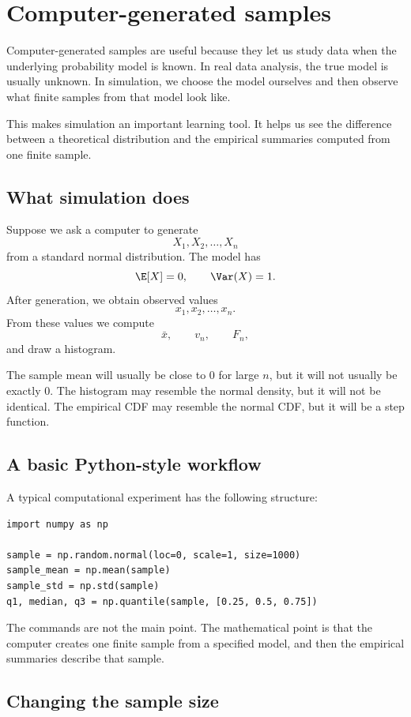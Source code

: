 \section{Computer-generated samples}

Computer-generated samples are useful because they let us study data when the
underlying probability model is known. In real data analysis, the true model is
usually unknown. In simulation, we choose the model ourselves and then observe
what finite samples from that model look like.

This makes simulation an important learning tool. It helps us see the difference
between a theoretical distribution and the empirical summaries computed from one
finite sample.

\subsection*{What simulation does}

Suppose we ask a computer to generate
\[
X_1,X_2,\ldots,X_n
\]
from a standard normal distribution. The model has
\[
\E[X]=0,
\qquad
\Var(X)=1.
\]
After generation, we obtain observed values
\[
x_1,x_2,\ldots,x_n.
\]
From these values we compute
\[
\bar{x},
\qquad
v_n,
\qquad
F_n,
\]
and draw a histogram.

The sample mean will usually be close to \(0\) for large \(n\), but it will not
usually be exactly \(0\). The histogram may resemble the normal density, but it
will not be identical. The empirical CDF may resemble the normal CDF, but it will
be a step function.

\subsection*{A basic Python-style workflow}

A typical computational experiment has the following structure:
\begin{verbatim}
import numpy as np

sample = np.random.normal(loc=0, scale=1, size=1000)
sample_mean = np.mean(sample)
sample_std = np.std(sample)
q1, median, q3 = np.quantile(sample, [0.25, 0.5, 0.75])
\end{verbatim}

The commands are not the main point. The mathematical point is that the computer
creates one finite sample from a specified model, and then the empirical
summaries describe that sample.

\subsection*{Changing the sample size}

